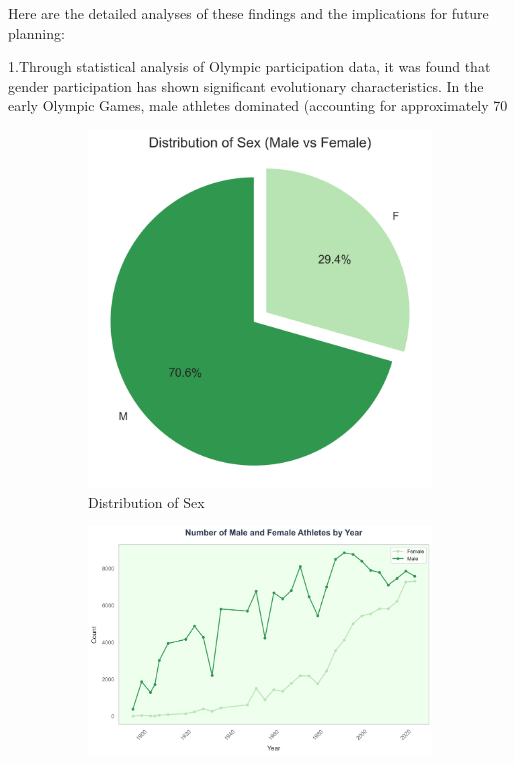 \documentclass{mcmthesis}
\begin{document}
Here are the detailed analyses of these findings and the implications for future planning:

1.Through statistical analysis of Olympic participation data, it was found that gender participation has shown significant evolutionary characteristics. In the early Olympic Games, male athletes dominated (accounting for approximately 70%

\begin{figure}[htbp]
    \centering
    \begin{subfigure}{0.45\textwidth}
        \centering
        \includegraphics[width=\textwidth]{graph/Distribution of Sex.png}
        \caption{Distribution of Sex}
        \label{subfig:player1}
    \end{subfigure}
    \hfill
    \begin{subfigure}{0.45\textwidth}
        \centering
        \includegraphics[width=\textwidth]{graph/Number_of_Athletes_by_Sex.png}

\end{subfigure}
\end{figure}
\end{document}
